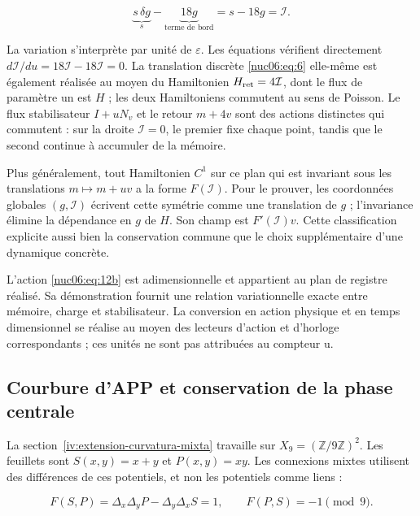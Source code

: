 \begin{equation}
\underbrace{s\,\delta g}_{s}
-\underbrace{18g}_{\text{terme de bord}}
=s-18g=\mathcal I.
\label{nuc06:eq:12c}
\end{equation}

La variation s’interprète par unité de \(\varepsilon\). Les équations vérifient directement \(d\mathcal I/du=18\mathcal I-18\mathcal I=0\). La translation discrète \eqref{nuc06:eq:6} elle-même est également réalisée au moyen du Hamiltonien \(H_{\rm ret}=4\mathcal I\), dont le flux de paramètre un est \(H\) ; les deux Hamiltoniens commutent au sens de Poisson. Le flux stabilisateur \(I+uN_v\) et le retour \(m+4v\) sont des actions distinctes qui commutent : sur la droite \(\mathcal I=0\), le premier fixe chaque point, tandis que le second continue à accumuler de la mémoire.

Plus généralement, tout Hamiltonien \(C^1\) sur ce plan qui est invariant sous les translations \(m\mapsto m+uv\) a la forme \(F(\mathcal I)\). Pour le prouver, les coordonnées globales \((g,\mathcal I)\) écrivent cette symétrie comme une translation de \(g\) ; l’invariance élimine la dépendance en \(g\) de \(H\). Son champ est \(F'(\mathcal I)v\). Cette classification explicite aussi bien la conservation commune que le choix supplémentaire d’une dynamique concrète.

L’action \eqref{nuc06:eq:12b} est adimensionnelle et appartient au plan de registre réalisé. Sa démonstration fournit une relation variationnelle exacte entre mémoire, charge et stabilisateur. La conversion en action physique et en temps dimensionnel se réalise au moyen des lecteurs d’action et d’horloge correspondants ; ces unités ne sont pas attribuées au compteur u.


\subsection{Courbure d’APP et conservation de la phase centrale
}

La section~\ref{iv:extension-curvatura-mixta} travaille sur \(X_9=(\mathbb Z/9\mathbb Z)^2\). Les feuillets sont \(S(x,y)=x+y\) et \(P(x,y)=xy\). Les connexions mixtes utilisent des différences de ces potentiels, et non les potentiels comme liens :

\begin{equation}
F(S,P)=\Delta_x\Delta_yP-\Delta_y\Delta_xS=1,
\qquad F(P,S)=-1\pmod9.
\label{nuc06:eq:13}
\end{equation}

